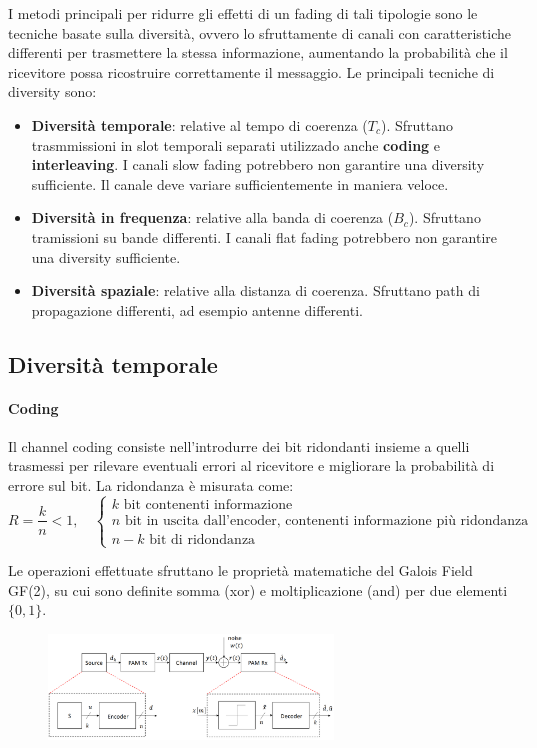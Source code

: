 I metodi principali per ridurre gli effetti di un fading di tali tipologie sono le tecniche basate sulla diversità, ovvero lo sfruttamente di canali con caratteristiche differenti per trasmettere la stessa informazione, aumentando la probabilità che il ricevitore possa ricostruire correttamente il messaggio.
Le principali tecniche di diversity sono:
\begin{itemize}
    \item \textbf{Diversità temporale}: relative al tempo di coerenza ($T_c$). Sfruttano trasmmissioni in slot temporali separati utilizzado anche \textbf{coding} e \textbf{interleaving}. I canali slow fading potrebbero non garantire una diversity sufficiente. Il canale deve variare sufficientemente in maniera veloce.
    \item \textbf{Diversità in frequenza}: relative alla banda di coerenza ($B_c$). Sfruttano tramissioni su bande differenti. I canali flat fading potrebbero non garantire una diversity sufficiente.
    \item \textbf{Diversità spaziale}: relative alla distanza di coerenza. Sfruttano path di propagazione differenti, ad esempio antenne differenti.
\end{itemize}

\subsection*{Diversità temporale}
\paragraph*{Coding}
Il channel coding consiste nell'introdurre dei bit ridondanti insieme a quelli trasmessi per rilevare eventuali errori al ricevitore e migliorare la probabilità di errore sul bit. 
La ridondanza è misurata come:
\[
    R = \frac{k}{n} < 1, \quad \begin{cases}
        k \text{ bit contenenti informazione} \\
        n \text{ bit in uscita dall'encoder, contenenti informazione più ridondanza} \\
        n - k \text{ bit di ridondanza}
    \end{cases}
\]

Le operazioni effettuate sfruttano le proprietà matematiche del Galois Field GF(2), su cui sono definite somma (xor) e moltiplicazione (and) per due elementi $\{0, 1\}$.

\begin{figure}[ht]
    \centering
    \includegraphics[width=0.675\textwidth]{imgs/encoder_decoder.jpg}
\end{figure}

